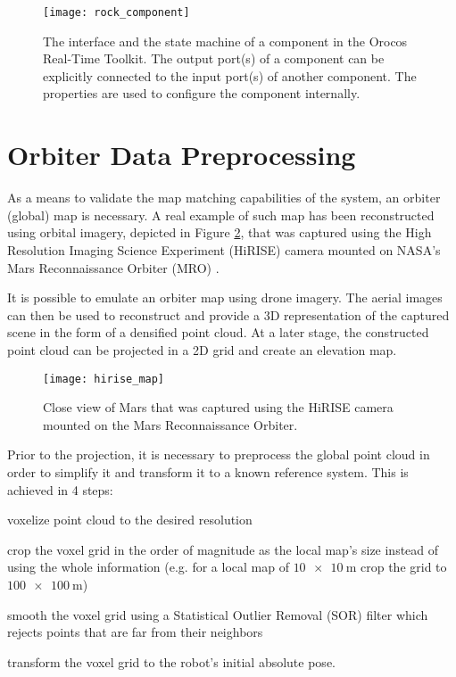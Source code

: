 \begin{figure}[h!]
    \centering
    \texttt{[image: rock\_component]}
    \caption[ROCK component interface]{
        The interface and the state machine of a component in the Orocos
        Real-Time Toolkit. The output port(s) of a component can be explicitly
        connected to the input port(s) of another component. The properties
        are used to configure the component internally.
    }
    \label{fig:rock_component}
\end{figure}

\section{Orbiter Data Preprocessing}

As a means to validate the map matching capabilities of the system,
an orbiter (global) map is necessary.
A real example of such map has been reconstructed using orbital imagery,
depicted in Figure \ref{fig:hirise_map}, that was captured using the
High Resolution Imaging Science Experiment (HiRISE) camera mounted
on NASA's Mars Reconnaissance Orbiter (MRO) \parencite{Gallagher2005}.

It is possible to emulate an orbiter map using drone imagery.
The aerial images can then be used to reconstruct and provide a 3D
representation of the captured scene in the form of a densified point cloud.
At a later stage, the constructed point cloud can be projected in a 2D
grid and create an elevation map.

\begin{figure}[h!]
    \centering
    \texttt{[image: hirise\_map]}
    \caption[Mars view from HiRISE]{
        Close view of Mars that was captured using the HiRISE camera
        mounted on the Mars Reconnaissance Orbiter.
    }
    \label{fig:hirise_map}
\end{figure}

Prior to the projection, it is necessary to preprocess the global point cloud
in order to simplify it and transform it to a known reference system.
This is achieved in 4 steps:
\begin{enumerate*}[label=(\roman*)]
    \item voxelize point cloud to the desired resolution
    \item crop the voxel grid in the order of magnitude as the local map's
        size instead of using the whole information
        (e.g. for a local map of $\SI{10 x 10}{\m}$ crop the grid to
        $\SI{100 x 100}{\m}$)
    \item smooth the voxel grid using a Statistical Outlier Removal (SOR)
        filter which rejects points that are far from their neighbors
    \item transform the voxel grid to the robot's initial absolute pose.
\end{enumerate*}

